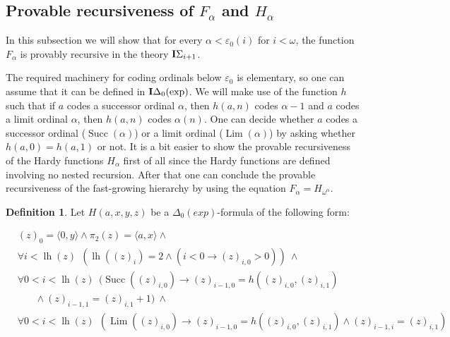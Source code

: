 \documentclass[8pt]{article}
\theoremstyle{definition}
\newtheorem{definition}{Definition}[section]
\theoremstyle{definition}
\theoremstyle{definition}
\theoremstyle{definition}
\theoremstyle{definition}
\theoremstyle{definition}
\theoremstyle{definition}
\theoremstyle{definition}
\theoremstyle{definition}
\theoremstyle{definition}
\theoremstyle{definition}
\theoremstyle{definition}
\theoremstyle{definition}
\theoremstyle{question}
\begin{document}
\subsection{Provable recursiveness of $F_{\alpha}$ and $H_{\alpha}$}

In this subsection we will show that for every $\alpha < \varepsilon_0(i)$ for $i < \omega$,
the function $F_{\alpha}$ is provably recursive in the theory ${\bf I}\Sigma_{i+1}$.

The required machinery for coding ordinals below $\varepsilon_0$ is elementary, 
so one can assume that it can be defined in ${\bf I}\Delta_0(\operatorname{exp})$. 
We will make use of the function $h$ such that if $a$ codes a successor ordinal $\alpha$, then $h(a, n)$
codes $\alpha - 1$ and $a$ codes a limit ordinal $\alpha$, then $h(a, n)$ codes $\alpha(n)$.
One can decide whether $a$ codes a successor ordinal ($\operatorname{Succ}(\alpha)$) or a limit
ordinal ($\operatorname{Lim}(\alpha)$) by asking whether $h(a, 0) = h(a, 1)$ or not. It is a bit easier
to show the provable recursiveness of the Hardy functions $H_{\alpha}$ first of all since the Hardy functions
are defined involving no nested recursion. After that one can conclude the provable recursiveness of
the fast-growing hierarchy by using the equation $F_{\alpha} = H_{\omega^{\alpha}}$.

\begin{definition}
  Let $H(a, x, y, z)$ be a $\Delta_0(exp)$-formula of the following form:

  \vspace{\baselineskip}

  $\begin{array}{lll}
    &(z)_0 = \langle 0, y \rangle \land \pi_2(z) = \langle a, x \rangle \land \: & \\
    &\forall i<\operatorname{lh}(z) \:\: (\operatorname{lh}((z)_i) = 2 \land (i < 0 \to (z)_{i, 0} > 0 )) \: \land & \\
    &\forall 0 < i < \operatorname{lh}(z) \:\: (\operatorname{Succ}((z)_{i, 0}) \to (z)_{i - 1, 0} = h((z)_{i, 0}, (z)_{i,1}) & \\
    & \:\:\:\:\:\:\:\: \land (z)_{i - 1, 1} = (z)_{i, 1} + 1) \: \land & \\
    &\forall 0 < i < \operatorname{lh}(z) \:\: (\operatorname{Lim}((z)_{i, 0}) \to (z)_{i - 1, 0} = h((z)_{i, 0}, (z)_{i, 1}) \land (z)_{i - 1, i} = (z)_{i, 1}) & 
  \end{array}$
\end{definition}
\end{document}
